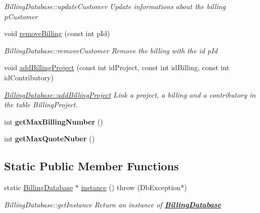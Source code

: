 \begin{DoxyCompactItemize}
\begin{DoxyCompactList}\small\item\em Billing\+Database\+::update\+Customer Update informations about the billing {\itshape p\+Customer} \end{DoxyCompactList}\item 
void \hyperlink{classBillingDatabase_a82e2c5503dc9b47a42bd592efece5532}{remove\+Billing} (const int p\+Id)
\begin{DoxyCompactList}\small\item\em Billing\+Database\+::remove\+Customer Remove the billing with the id {\itshape p\+Id} \end{DoxyCompactList}\item 
void \hyperlink{classBillingDatabase_ac8a618d0c2420f8db417c65fcdbc85c6}{add\+Billing\+Project} (const int id\+Project, const int id\+Billing, const int id\+Contributory)
\begin{DoxyCompactList}\small\item\em \hyperlink{classBillingDatabase_ac8a618d0c2420f8db417c65fcdbc85c6}{Billing\+Database\+::add\+Billing\+Project} Link a project, a billing and a contributory in the table Billing\+Project. \end{DoxyCompactList}\item 
\hypertarget{classBillingDatabase_a342ccaed3192fadc91a15468a7d3d565}{int {\bfseries get\+Max\+Billing\+Number} ()}\label{classBillingDatabase_a342ccaed3192fadc91a15468a7d3d565}

\item 
\hypertarget{classBillingDatabase_adc3351f464ec63e15ba663ba4fb24f8f}{int {\bfseries get\+Max\+Quote\+Nuber} ()}\label{classBillingDatabase_adc3351f464ec63e15ba663ba4fb24f8f}

\end{DoxyCompactItemize}
\subsection*{Static Public Member Functions}
\begin{DoxyCompactItemize}
\item 
static \hyperlink{classBillingDatabase}{Billing\+Database} $\ast$ \hyperlink{classBillingDatabase_a80a2bc546d92863a8b54786cfd832189}{instance} ()  throw (\+Db\+Exception$\ast$)
\begin{DoxyCompactList}\small\item\em Billing\+Database\+::get\+Instance Return an instance of {\bfseries \hyperlink{classBillingDatabase}{Billing\+Database}} \end{DoxyCompactList}\end{DoxyCompactItemize}
